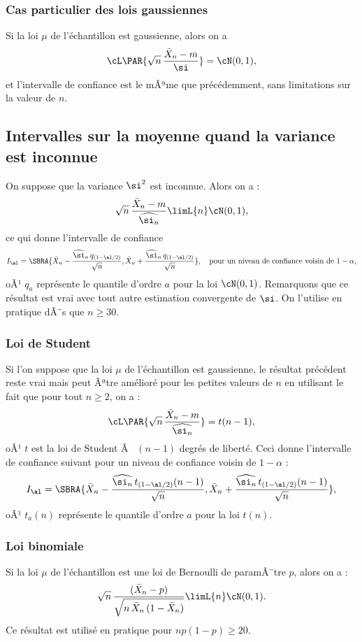 \subsubsection{Cas particulier des lois gaussiennes}

Si la loi $\mu$ de l'échantillon est gaussienne, alors on a
$$
\cL\PAR{\sqrt{n}\,\frac{\bar{X}_n-m}{\si}} = \cN(0,1),
$$
et l'intervalle de confiance est le mÃªme que précédemment, sans limitations
sur la valeur de $n$.


\subsection{Intervalles sur la moyenne quand la variance est inconnue} 

On suppose que la variance $\si^2$ est inconnue. Alors on a :
$$
\sqrt{n}\,\frac{\bar{X}_n-m}{\widehat{\si_n}} \limL{n} \cN(0,1),
$$
ce qui donne l'intervalle de confiance
$$
I_\al=\SBRA{\bar{X}_n-\frac{\widehat{\si}_n\,q_{(1-\al/2)}}{\sqrt{n}},
  \bar{X}_n+\frac{\widehat{\si}_n\,q_{(1-\al/2)}}{\sqrt{n}}},
\text{\quad pour un niveau de confiance voisin de $1-\alpha$},
$$
oÃ¹ $q_a$ représente le quantile d'ordre $a$ pour la loi $\cN(0,1)$.
Remarquons que ce résultat est vrai avec tout autre estimation convergente
de $\si$. On l'utilise en pratique dÃ¨s que $n \geq 30$.

\subsubsection{Loi de Student} 

Si l'on suppose que la loi $\mu$ de l'échantillon est gaussienne, le résultat
précédent reste vrai mais peut Ãªtre amélioré pour les petites valeurs de $n$
en utilisant le fait que pour tout $n\geq 2$, on a :
$$
\cL\PAR{\sqrt{n}\,\frac{\bar{X}_n-m}{\widehat{\si_n}}} = t(n-1),
$$
oÃ¹ $t$ est la loi de Student Ã  $(n-1)$ degrés de liberté. Ceci donne
l'intervalle de confiance suivant pour un niveau de confiance voisin de
$1-\alpha$ :
$$
I_\al=\SBRA{\bar{X}_n-\frac{\widehat{\si_n}\,t_{(1-\al/2)}(n-1)}{\sqrt{n}},
  \bar{X}_n+\frac{\widehat{\si_n}\,t_{(1-\al/2)}(n-1)}{\sqrt{n}}},
$$
oÃ¹ $t_a(n)$ représente le quantile d'ordre $a$ pour la loi $t(n)$.

\subsubsection{Loi binomiale} 

Si la loi $\mu$ de l'échantillon est une loi de Bernoulli de paramÃ¨tre $p$,
alors on a :
$$
\sqrt{n}\,\frac{(\bar{X}_n-p)}{\sqrt{n\,\bar{X}_n\,(1-\bar{X}_n)}}
\limL{n}\cN(0,1).
$$
Ce résultat est utilisé en pratique pour $np(1-p)\geq 20$.


